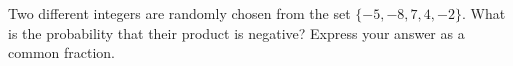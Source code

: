 Two different integers are randomly chosen from the set $\{-5,-8,7,4,-2\}$. What is the probability that their product is negative? Express your answer as a common fraction.
